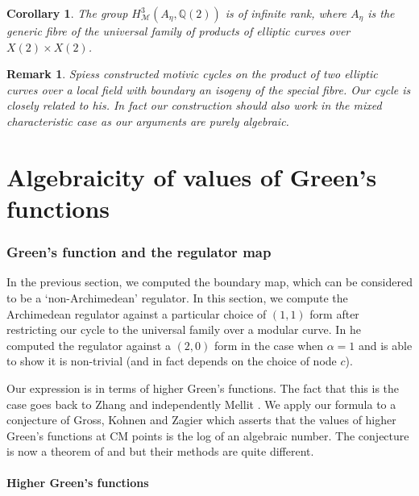 \documentclass[11pt,a4paper]{article}
\newtheorem{cor}[defn]{Corollary}
\newtheorem{rem}[defn]{Remark}
\newcommand {\Q}{{\mathds Q}}
\newcommand {\M}{{\mathcal M}}
\begin{document}
\begin{cor}
	The group $H^3_{\M}(A_{\eta},\Q(2))$ is of infinite rank, where $A_{\eta}$ is the generic fibre of the universal family of products of elliptic curves over $X(2) \times X(2)$. 
\end{cor}

\begin{rem} Spiess \cite{spie} constructed motivic cycles on the product of two elliptic  curves over a local field with boundary an isogeny of the special fibre. Our cycle is closely related to his. In fact our construction should also work in the mixed characteristic case as our arguments are purely algebraic. 
	
	\end{rem}
	
	
\part{Algebraicity of values of Green's functions}	


\section{Green's function and the regulator map}

\label{greensfunctions}





In the previous section, we computed the boundary map, which can be considered to be a `non-Archimedean' regulator. In this section, we compute the Archimedean regulator against a particular choice of $(1,1)$ form after restricting our cycle to the universal family over a modular curve. In \cite{sato} he computed the  regulator against a $(2,0)$ form in the case when $\alpha=1$ and is able to show it is non-trivial (and in fact depends on the choice of node $c$). 
 

Our expression is in terms of higher Green's functions. The fact that this is the case goes back to Zhang \cite{zhan} and independently Mellit \cite{mell}. We apply our formula to a conjecture of Gross, Kohnen and Zagier which asserts that the values of higher Green's functions at CM points is the log of an algebraic number. The conjecture is now a theorem of \cite{li} and \cite{BLY} but their methods are quite different. 
 


\subsection{Higher Green's functions}
\end{document}
